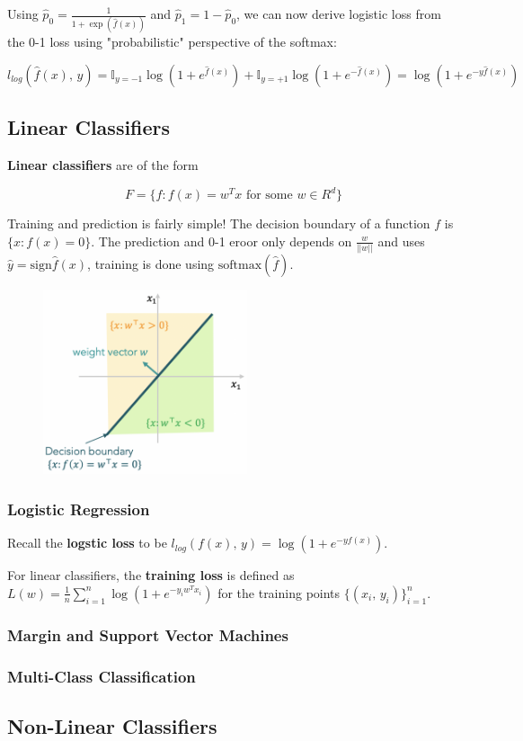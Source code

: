 \documentclass[a4paper]{extarticle}
\begin{document}
Using \(\hat{p}_0 = \frac{1}{1 + \exp(\hat{f}(x))}\) and \(\hat{p}_1 = 1 - \hat{p}_0\), we can now derive logistic loss from the 0-1 loss using "probabilistic" perspective of the softmax:

\[
    l_{log}(\hat{f}(x), \, y) = \mathbb{I}_{y = -1}\log(1 + e^{\hat{f}(x)}) + \mathbb{I}_{y = + 1}\log(1 + e^{- \hat{f}(x)}) = \log(1 + e^{-y\hat{f}(x)})
\]

\subsection{Linear Classifiers}

\textbf{Linear classifiers} are of the form

\[
    F = \{f : f(x) = w^Tx \text{ for some } w \in R^d\}
\]

Training and prediction is fairly simple! The decision boundary of a function \(f\) is \(\{x : f(x) = 0\}\). The prediction and 0-1 eroor only depends on \(\frac{w}{||w||}\) and uses \(\hat{y} = \text{sign} \hat{f}(x)\), training is done using \(\text{softmax}(\hat{f})\).

\begin{figure}[H]
    \includegraphics[width=6cm]{../images/IntroML_Fig4-5}
    \centering
\end{figure}

\subsubsection{Logistic Regression}

Recall the \textbf{logstic loss} to be \(l_{log}(f(x), \, y) = \log (1 + e^{-yf(x)})\).

For linear classifiers, the \textbf{training loss} is defined as \(L(w) = \frac{1}{n}\sum_{i = 1}^n \log(1 + e^{-y_iw^Tx_i})\) for the training points \(\{(x_i, \, y_i)\}_{i = 1}^n\).

\subsubsection{Margin and Support Vector Machines}

\subsubsection{Multi-Class Classification}

\subsection{Non-Linear Classifiers}
\end{document}
